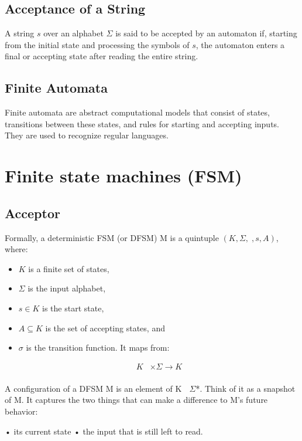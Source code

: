 \documentclass{article}
\begin{document}
\subsection{Acceptance of a String}
A string $s$ over an alphabet $\Sigma$ is said to be accepted by an automaton
if, starting from the initial state and processing the symbols of $s$, the
automaton enters a final or accepting state after reading the entire string.

\subsection{Finite Automata}
Finite automata are abstract computational models that consist of states,
transitions between these states, and rules for starting and accepting inputs.
They are used to recognize regular languages.


\section{Finite state machines (FSM)}

\subsection{Acceptor}

Formally, a deterministic FSM (or DFSM) M is a quintuple $(K, \Sigma, , s, A)$,
where: 



\begin{itemize} 
\item $K$ is a finite set of states,
\item $\Sigma$ is the input alphabet, 
\item $s \in K$ is the
start state, 
\item $A \subseteq K$ is the set of accepting states, and 
\item $\sigma$ is the transition function. It maps from:

		\begin{align*} K &\times \Sigma \to K \\ \end{align*}

\end{itemize}

A configuration of a DFSM M is an element of K  $\Sigma$*. Think of it as a snapshot
of M. It captures the two things that can make a difference to M’s future
behavior:

• its current state • the input that is still left to read.
\end{document}
